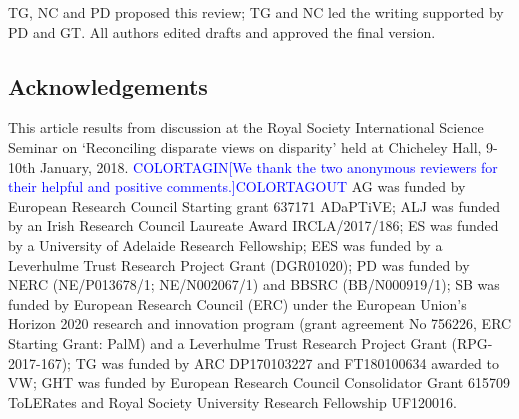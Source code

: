 \documentclass[12pt,letterpaper]{article}
\begin{document}
TG, NC and PD proposed this review; TG and NC led the writing supported by PD and GT.
All authors edited drafts and approved the final version.

\subsection{Acknowledgements}

This article results from discussion at the Royal Society International Science Seminar on `Reconciling disparate views on disparity' held at Chicheley Hall, 9-10th January, 2018.
\textcolor{blue}{COLORTAGIN[We thank the two anonymous reviewers for their helpful and positive comments.]COLORTAGOUT}
AG was funded by European Research Council Starting grant 637171 ADaPTiVE;
ALJ was funded by an Irish Research Council Laureate Award IRCLA/2017/186;
ES was funded by a University of Adelaide Research Fellowship;
EES was funded by a Leverhulme Trust Research Project Grant (DGR01020);
PD was funded by NERC (NE/P013678/1; NE/N002067/1) and BBSRC (BB/N000919/1);
SB was funded by European Research Council (ERC) under the European Union's Horizon 2020 research and innovation program (grant agreement No 756226, ERC Starting Grant: PalM) and a Leverhulme Trust Research Project Grant (RPG-2017-167);
TG was funded by ARC DP170103227 and FT180100634 awarded to VW;
GHT was funded by European Research Council Consolidator Grant 615709 ToLERates and Royal Society University Research Fellowship UF120016.



\end{document}
